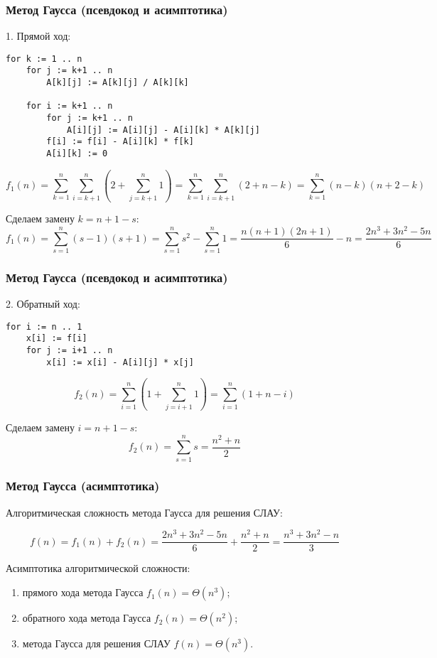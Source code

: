\documentclass[10pt]{beamer}
\begin{document}
\begin{frame}[fragile]
\frametitle{Метод Гаусса (псевдокод и асимптотика)}

1. Прямой ход:

\begin{lstlisting}
for k := 1 .. n
    for j := k+1 .. n
	    A[k][j] := A[k][j] / A[k][k]

    for i := k+1 .. n
        for j := k+1 .. n
            A[i][j] := A[i][j] - A[i][k] * A[k][j]
        f[i] := f[i] - A[i][k] * f[k]
        A[i][k] := 0
\end{lstlisting}

$$f_1(n) = \sum_{k=1}^{n} \sum_{i=k+1}^{n} \left(2 + \sum_{j=k+1}^{n} 1 \right) = 
\sum_{k=1}^{n} \sum_{i=k+1}^{n} (2 + n - k) = 
\sum_{k=1}^{n} (n - k)(n + 2 - k)$$

Сделаем замену $k = n + 1 - s$:
$$f_1(n) = \sum_{s=1}^{n} (s - 1)(s + 1) = \sum_{s=1}^{n} s^2 - \sum_{s=1}^{n} 1 =\frac{n(n+1)(2n+1)}{6} - n = \frac{2 n^3 + 3 n^2 - 5 n}{6}$$

\end{frame}

\begin{frame}[fragile]
\frametitle{Метод Гаусса (псевдокод и асимптотика)}

2. Обратный ход:

\begin{lstlisting}
for i := n .. 1
    x[i] := f[i]
    for j := i+1 .. n
        x[i] := x[i] - A[i][j] * x[j]
\end{lstlisting}


$$f_2(n) = \sum_{i=1}^{n} \left(1 + \sum_{j=i+1}^{n} 1 \right) = 
\sum_{i=1}^{n} (1 + n - i)$$

Сделаем замену $i = n + 1 - s$:
$$f_2(n) = \sum_{s=1}^{n} s = \frac{n^2 + n}{2}$$
\end{frame}

\begin{frame}[fragile]
\frametitle{Метод Гаусса (асимптотика)}

Алгоритмическая сложность метода Гаусса для решения СЛАУ:

$$f(n) = f_1(n) + f_2(n) = \frac{2 n^3 + 3 n^2 - 5 n}{6} + \frac{n^2 + n}{2} = \frac{n^3 + 3 n^2 - n}{3}$$
 
Асимптотика алгоритмической сложности:
\begin{enumerate}
\item прямого хода метода Гаусса $f_1(n) = \Theta(n^3)$;
\item обратного хода метода Гаусса $f_2(n) = \Theta(n^2)$;
\item метода Гаусса для решения СЛАУ $f(n) = \Theta(n^3)$.
\end{enumerate}
\end{frame}
\end{document}

